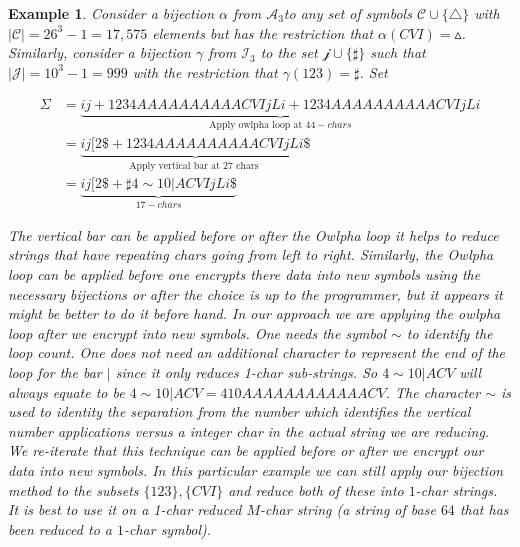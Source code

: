\documentclass[amsmath,12pt,a4paper]{amsart}
\newtheorem{example}{Example}
\begin{document}
\begin{example}\label{Ex5}
Consider a bijection $\alpha$ from $\mathcal{A}_3 $to any set of symbols $\mathcal{C}\cup \{\triangle\}$ with $|\mathcal{C}| = 26^3-1=17,575$ elements but has the restriction that $\alpha(CVI) = \vartriangle$. Similarly, consider a bijection $\gamma$ from $\mathcal{I}_3$ to the set $\mathcal{j}\cup \{\sharp\}$ such that $|\mathcal{J}| = 10^3-1=999$ with the restriction that $\gamma(123) = \sharp$. Set 


\begin{equation}\label{Eq48}
\begin{split}
\Sigma & = \underbrace{ij+1234AAAAAAAAAACVIjLi+1234AAAAAAAAAACVIjLi}_{\text{Apply owlpha loop at $44-chars$}}\\
& = \underbrace{ij[2\$+1234AAAAAAAAAACVIjLi\$}_{\text{Apply vertical bar at 27 chars }}\\
& = \underbrace{ij[2\$+\sharp 4 \sim 10\vert ACVIjLi\$}_{17-chars}
\end{split}
\end{equation} 

The vertical bar can be applied before or after the Owlpha loop it helps to reduce strings that have repeating chars going from left to right. Similarly, the Owlpha loop can be applied before one encrypts there data into new symbols using the necessary bijections or after the choice is up to the programmer, but it appears it might be better to do it before hand. In our approach we are applying the owlpha loop after we encrypt into new symbols. One needs the symbol $\sim$ to identify the loop count.  One does not need an additional character to represent the end of the loop for the bar $\vert$ since it only reduces 1-char sub-strings. So $4\sim 10\vert ACV$ will always equate to be $4\sim 10\vert ACV = 410AAAAAAAAAAAACV$. The character $\sim$ is used to identity the separation from the number which identifies the vertical number applications versus a integer char in the actual string we are reducing. We re-iterate that this technique can be applied before or after we encrypt our data into new symbols. In this particular example we can still apply our bijection method to the subsets $\{123\} ,\{CVI\}$ and reduce both of these into $1$-char strings. It is best to use it on a 1-char reduced $M$-char string (a string of base $64$ that has been reduced to a $1$-char symbol). \\

\end{example}
\end{document}
